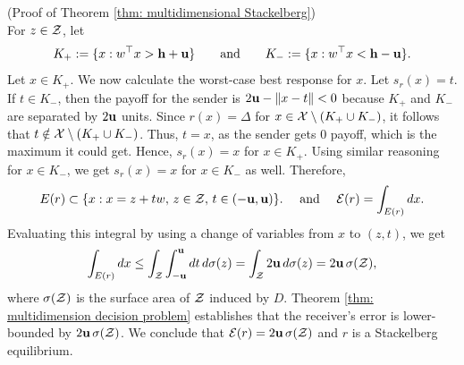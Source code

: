\begin{apdxproof}{(Proof of Theorem \ref{thm: multidimensional Stackelberg})}\label{proof: multidimensional stackelberg}\\
For $z \in \mathcal{Z}$, let
\[
K_+ := \{x : w^\top x > \mathbf{h} + \mathbf{u}\} \quad \hbox{\quad and\quad} \quad K_- := \{x : w^\top x < \mathbf{h} - \mathbf{u}\}.
\]
Let $x \in K_+$. We now calculate the worst-case best response for $x$. Let $s_r(x) = t$. If $t \in K_-$, then the payoff for the sender is $2\mathbf{u} - \|x - t\| < 0$ because $K_+$ and $K_-$ are separated by $2\mathbf{u}$ units. Since $r(x) = \Delta$ for $x \in \mathcal{X} \setminus (K_+ \cup K_-)$, it follows that $t \notin \mathcal{X} \setminus (K_+ \cup K_-)$. Thus, $t = x$, as the sender gets $0$ payoff, which is the maximum it could get. Hence, $s_r(x) = x$ for $x \in K_+$. Using similar reasoning for $x \in K_-$, we get $s_r(x) = x$ for $x \in K_-$ as well. Therefore,
\[
E(r) \subset \{x : x = z + t w,\, z \in \cg{Z},\, t \in (-\uu, \uu)\}.
\text{ and } 
\cg{E}(r) = \int_{E(r)} dx.
\]
Evaluating this integral by using a change of variables from $x$ to $(z, t)$, we get
\[
\int_{E(r)} dx \leq \int_{\mathcal{Z}} \int_{-\mathbf{u}}^{\mathbf{u}} dt\, d\sigma(z) = \int_{\mathcal{Z}} 2\mathbf{u}\, d\sigma(z) = 2\mathbf{u}\, \sigma(\mathcal{Z}),
\]
where $\sigma(\mathcal{Z})$ is the surface area of $\mathcal{Z}$ induced by $D$.
Theorem \ref{thm: multidimension decision problem} establishes that the receiver's error is lower-bounded by $2\mathbf{u}\,\sigma(\mathcal{Z})$. We conclude that $\mathcal{E}(r) = 2\mathbf{u}\, \sigma(\mathcal{Z})$ and $r$ is a Stackelberg equilibrium.
\end{apdxproof}


